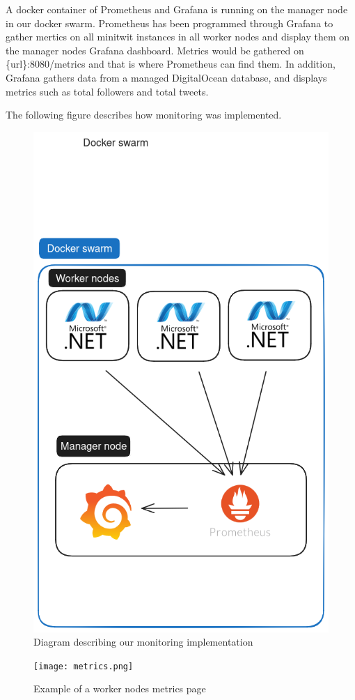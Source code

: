 A docker container of Prometheus and Grafana is running on the manager node in our docker swarm. 
Prometheus has been programmed through Grafana to gather mertics on all minitwit instances in all worker nodes and display them on the manager nodes Grafana dashboard. 
Metrics would be gathered on \{url\}:8080/metrics and that is where Prometheus can find them. 
In addition, Grafana gathers data from a managed DigitalOcean database, and displays metrics such as total followers and total tweets.

The following figure describes how monitoring was implemented.

\begin{figure}[H]
	\centering
	\includegraphics[width=1\textwidth]{Monitoring2.png}
	\caption{Diagram describing our monitoring implementation}
	\label{fig:Monitoring2}
\end{figure}
\begin{figure}[H]
	\centering
	\texttt{[image: metrics.png]}
	\caption{Example of a worker nodes metrics page}
	\label{fig:metrics}
\end{figure}


